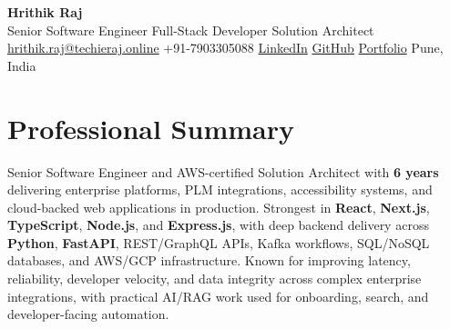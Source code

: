\documentclass[letterpaper,10pt]{extarticle}
\begin{document}
\begin{center}
  {\LARGE \textbf{Hrithik Raj}} \\ \vspace{2pt}
  \small Senior Software Engineer \textbar{} Full-Stack Developer \textbar{} Solution Architect \\ \vspace{3pt}
  \footnotesize
  \href{mailto:hrithik.raj@techieraj.online}{hrithik.raj@techieraj.online} \textbar{}
  +91-7903305088 \textbar{}
  \href{https://www.linkedin.com/in/hrithik-raj-734a0b1aa}{LinkedIn} \textbar{}
  \href{https://github.com/HrithikRaj1999}{GitHub} \textbar{}
  \href{https://www.techieraj.online/}{Portfolio} \textbar{}
  Pune, India
\end{center}

\section{Professional Summary}

\small{
Senior Software Engineer and AWS-certified Solution Architect with \textbf{6 years} delivering enterprise platforms, PLM integrations, accessibility systems, and cloud-backed web applications in production.
Strongest in \textbf{React}, \textbf{Next.js}, \textbf{TypeScript}, \textbf{Node.js}, and \textbf{Express.js}, with deep backend delivery across \textbf{Python}, \textbf{FastAPI}, REST/GraphQL APIs, Kafka workflows, SQL/NoSQL databases, and AWS/GCP infrastructure.
Known for improving latency, reliability, developer velocity, and data integrity across complex enterprise integrations, with practical AI/RAG work used for onboarding, search, and developer-facing automation.
\par}

\end{document}
